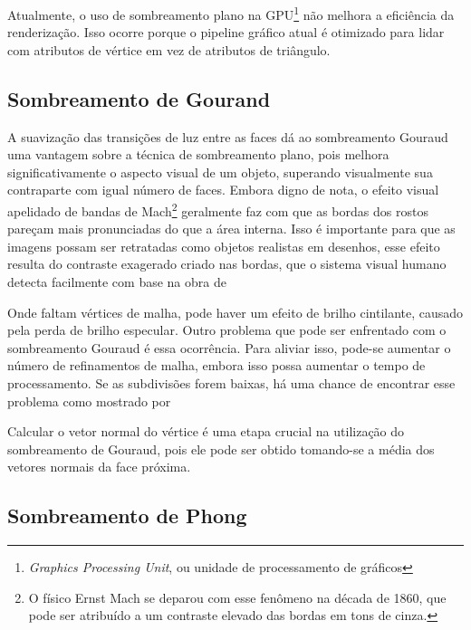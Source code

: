 Atualmente, o uso de sombreamento plano na GPU\footnote{\textit{Graphics Processing Unit}, ou unidade de processamento de gráficos} não melhora a eficiência da renderização. Isso ocorre porque o pipeline gráfico atual é otimizado para lidar com atributos de vértice em vez de atributos de triângulo.

\subsection{Sombreamento de Gourand}

A suavização das transições de luz entre as faces dá ao sombreamento Gouraud uma vantagem sobre a técnica de sombreamento plano, pois melhora significativamente o aspecto visual de um objeto, superando visualmente sua contraparte com igual número de faces.  Embora digno de nota, o efeito visual apelidado de bandas de Mach\footnote{O físico Ernst Mach se deparou com esse fenômeno na década de 1860, que pode ser atribuído a um contraste elevado das bordas em tons de cinza.} geralmente faz com que as bordas dos rostos pareçam mais pronunciadas do que a área interna. Isso é importante para que as imagens possam ser retratadas como objetos realistas em desenhos, esse efeito resulta do contraste exagerado criado nas bordas, que o sistema visual humano detecta facilmente com base na obra de 

Onde faltam vértices de malha, pode haver um efeito de brilho cintilante, causado pela perda de brilho especular.  Outro problema que pode ser enfrentado com o sombreamento Gouraud é essa ocorrência.  Para aliviar isso, pode-se aumentar o número de refinamentos de malha, embora isso possa aumentar o tempo de processamento.  Se as subdivisões forem baixas, há uma chance de encontrar esse problema como mostrado por 

Calcular o vetor normal do vértice é uma etapa crucial na utilização do sombreamento de Gouraud, pois ele pode ser obtido tomando-se a média dos vetores normais da face próxima.

\subsection{Sombreamento de Phong}

